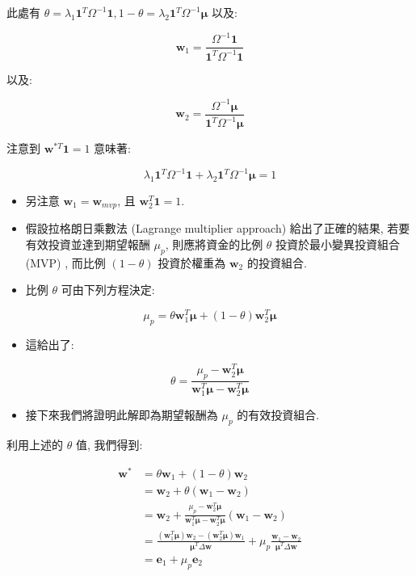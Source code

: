 \documentclass[letterpaper]{article}
\begin{document}
		此處有 $\theta=\lambda_{1} \mathbf{1}^{T} \Omega^{-1} \mathbf{1}, 1-\theta=\lambda_{2} \mathbf{1}^{T} \Omega^{-1} \boldsymbol{\mu}$ 以及: 
		
		$$
		\mathbf{w}_{1}=\frac{\Omega^{-1} \mathbf{1}}{\mathbf{1}^{T} \Omega^{-1} \mathbf{1}}
		$$
		
		以及: 
		
		$$
		\mathbf{w}_{2}=\frac{\Omega^{-1} \boldsymbol{\mu}}{\mathbf{1}^{T} \Omega^{-1} \boldsymbol{\mu}}
		$$
		
		注意到 $\mathbf{w}^{* T} \mathbf{1}=1$ 意味著: 
		
		$$
		\lambda_{1} \mathbf{1}^{T} \Omega^{-1} \mathbf{1}+\lambda_{2} \mathbf{1}^{T} \Omega^{-1} \boldsymbol{\mu}=1
		$$
		
		\begin{itemize}
			\item 另注意 $\mathbf{w}_{1} = \mathbf{w}_{mvp}$, 且 $\mathbf{w}_{2}^{T} \mathbf{1} = 1$. 
			\item 假設拉格朗日乘數法 (Lagrange multiplier approach) 給出了正確的結果, 若要有效投資並達到期望報酬 $\mu_{p}$, 則應將資金的比例 $\theta$ 投資於最小變異投資組合 (MVP) , 而比例 $ (1 - \theta) $ 投資於權重為 $\mathbf{w}_{2}$ 的投資組合. 
			\item 比例 $\theta$ 可由下列方程決定: 
		\end{itemize}
		
		
		$$
		\mu_{p}=\theta \mathbf{w}_{1}^{T} \boldsymbol{\mu}+ (1-\theta) \mathbf{w}_{2}^{T} \boldsymbol{\mu}
		$$
		
		\begin{itemize}
			\item 這給出了: 
		\end{itemize}
		
		$$
		\theta=\frac{\mu_{p}-\mathbf{w}_{2}^{T} \boldsymbol{\mu}}{\mathbf{w}_{1}^{T} \boldsymbol{\mu}-\mathbf{w}_{2}^{T} \boldsymbol{\mu}}
		$$
		
		\begin{itemize}
			\item 接下來我們將證明此解即為期望報酬為 $\mu_{p}$ 的有效投資組合. 
		\end{itemize}
		
		
		利用上述的 $\theta$ 值, 我們得到: 
		
		$$
		\begin{aligned}
			\mathbf{w}^{*} & =\theta \mathbf{w}_{1}+ (1-\theta) \mathbf{w}_{2} \\
			& =\mathbf{w}_{2}+\theta\left (\mathbf{w}_{1}-\mathbf{w}_{2}\right) \\
			& =\mathbf{w}_{2}+\frac{\mu_{p}-\mathbf{w}_{2}^{T} \boldsymbol{\mu}}{\mathbf{w}_{1}^{T} \boldsymbol{\mu}-\mathbf{w}_{2}^{T} \boldsymbol{\mu}}\left (\mathbf{w}_{1}-\mathbf{w}_{2}\right) \\
			& =\frac{\left (\mathbf{w}_{1}^{T} \boldsymbol{\mu}\right) \mathbf{w}_{2}-\left (\mathbf{w}_{2}^{T} \boldsymbol{\mu}\right) \mathbf{w}_{1}}{\boldsymbol{\mu}^{T} \Delta \mathbf{w}}+\mu_{p} \frac{\mathbf{w}_{1}-\mathbf{w}_{2}}{\boldsymbol{\mu}^{T} \Delta \mathbf{w}} \\
			& =\mathbf{e}_{1}+\mu_{p} \mathbf{e}_{2}
		\end{aligned}
		$$
		
\end{document}
